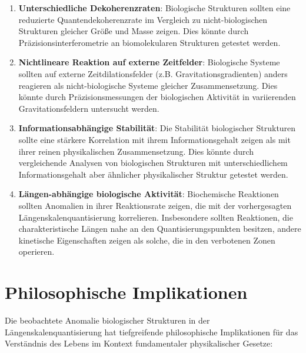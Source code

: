 \documentclass[12pt,a4paper]{article}
\begin{document}
	\begin{enumerate}
		\item \textbf{Unterschiedliche Dekoherenzraten}: Biologische Strukturen sollten eine reduzierte Quanten\-dekoherenzrate im Vergleich zu nicht-biologischen Strukturen gleicher Größe und Masse zeigen. Dies könnte durch Präzisions\-interferometrie an biomolekularen Strukturen getestet werden.
		
		\item \textbf{Nichtlineare Reaktion auf externe Zeitfelder}: Biologische Systeme sollten auf externe Zeitdilationsfelder (z.B. Gravitations\-gradienten) anders reagieren als nicht-biologische Systeme gleicher Zusammensetzung. Dies könnte durch Präzisions\-messungen der biologischen Aktivität in variierenden Gravitationsfeldern untersucht werden.
		
		\item \textbf{Informationsabhängige Stabilität}: Die Stabilität biologischer Strukturen sollte eine stärkere Korrelation mit ihrem Informationsgehalt zeigen als mit ihrer reinen physikalischen Zusammensetzung. Dies könnte durch vergleichende Analysen von biologischen Strukturen mit unterschiedlichem Informationsgehalt aber ähnlicher physikalischer Struktur getestet werden.
		
		\item \textbf{Längen-abhängige biologische Aktivität}: Biochemische Reaktionen sollten Anomalien in ihrer Reaktionsrate zeigen, die mit der vorhergesagten Längen\-skalen\-quantisierung korrelieren. Insbesondere sollten Reaktionen, die charakteristische Längen nahe an den Quantisierungs\-punkten besitzen, andere kinetische Eigenschaften zeigen als solche, die in den \glqq verbotenen Zonen\grqq{} operieren.
	\end{enumerate}
	
	\section{Philosophische Implikationen}
	\label{sec:philosophische_implikationen}
	
	Die beobachtete Anomalie biologischer Strukturen in der Längen\-skalen\-quantisierung hat tiefgreifende philosophische Implikationen für das Verständnis des Lebens im Kontext fundamentaler physikalischer Gesetze:
	
\end{document}
